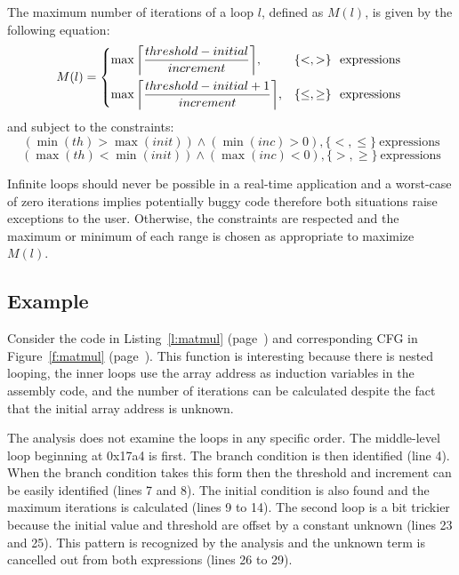  
 
The maximum number of iterations of a loop $l$, defined as $M(l)$, is given by the following equation:
\begin{equation}
	M(l) = 
	\begin{dcases*}
		\max{\left \lceil \frac{threshold - initial}{increment} \right \rceil}, & $\{<,>\}$ \ expressions \\
		\max{\left \lceil \frac{threshold - initial + 1}{increment} \right \rceil}, & $\{\leq,\geq\}$ \ expressions
	\end{dcases*}
	\label{eq:max}
\end{equation}
and subject to the constraints:
\begin{equation}
(\min(th) > \max(init)) \wedge (\min(inc) > 0), \{<,\leq\} \ \text{expressions} 
\end{equation}
\begin{equation}
(\max(th) < \min(init)) \wedge (\max(inc) < 0), \{>,\geq\} \ \text{expressions} 
\end{equation}

	Infinite loops should never be possible in a real-time application and a worst-case of zero iterations implies potentially buggy code therefore both situations raise exceptions to the user. 
	Otherwise, the constraints are respected and the maximum or minimum of each range is chosen as appropriate to maximize $M(l)$.	





\subsection{Example}
	Consider the code in Listing~\ref{l:matmul} (page~\pageref{l:matmul}) and corresponding CFG in Figure~\ref{f:matmul} (page~\pageref{f:matmul}). 
	This function is interesting because there is nested looping, the inner loops use the array address as induction variables in the assembly code, and the number of iterations can be calculated despite the fact that the initial array address is unknown.




	The analysis does not examine the loops in any specific order. 
	The middle-level loop beginning at 0x17a4 is first. The branch condition is then identified (line 4). 
	When the branch condition takes this form then the threshold and increment can be easily identified (lines 7 and 8). 
	The initial condition is also found and the maximum iterations is calculated (lines 9 to 14). 
	The second loop is a bit trickier because the initial value and threshold are offset by a constant unknown (lines 23 and 25). 
	This pattern is recognized by the analysis and the unknown term is cancelled out from both expressions (lines 26 to 29).

